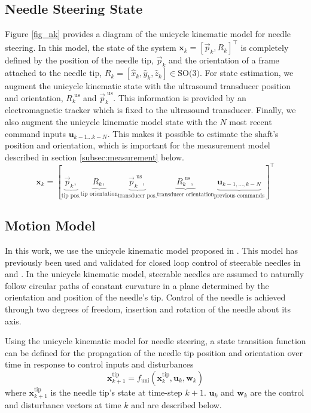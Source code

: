 \documentclass[journal,transmag]{IEEEtran}
\newcommand{\bvar}[2]{\mathbf{#1}_{#2}}
\newcommand{\usorientation}[1][k]{R^{\text{ us}}_{#1}}
\newcommand{\uspos}[1][k]{\vec{p}^{\text{ us}}_{#1}}
\newcommand{\unistate}[2]{\mathbf{#1}^{\text{tip}}_{#2}}
\begin{document}
\subsection{Needle Steering State} \label{subsec:state}
Figure \ref{fig_nk} provides a diagram of the unicycle kinematic model for needle steering.  In this model, the state of the system $\bvar{x}{k} =  \left[\vec{p}_k, R_k\right]^\top$ is completely defined by the position of the needle tip, $\vec{p}_k$ and the orientation of a frame attached to the needle tip, $R_k = \left[\hat{x}_k,\hat{y}_k,\hat{z}_k\right] \in \text{SO(3)}$.  For state estimation, we augment the unicycle kinematic state with the ultrasound transducer position and orientation, $\usorientation$ and $\uspos$.  This information is provided by an electromagnetic tracker which is fixed to the ultrasound transducer.  Finally,  we also augment the unicycle kinematic model state with the $N$ most recent command inputs $\bvar{u}{k-1...k-N}$.  This makes it possible to estimate the shaft's position and orientation, which is important for the measurement model described in section \ref{subsec:measurement} below.
\begin{dmath*}
\bvar{x}{k} =  \left[\underbrace{\vec{p}_k,}_{\text{tip pos.}} \underbrace{R_k,}_{\text{tip orientation}} \underbrace{\uspos,}_{\text{transducer pos.}} \underbrace{\usorientation,}_{\text{transducer orientation}} \underbrace{\bvar{u}{k-1,...,k-N}}_{\text{previous commands}}\right]^\top
\end{dmath*}


\subsection{Motion Model} \label{subsec:unicycle}
In this work, we use the unicycle kinematic model proposed in \cite{Park2005}.  This model has previously been used and validated for closed loop control of steerable needles in \cite{Majewicz2013} and \cite{adebar2014recursive}.  In the unicycle kinematic model, steerable needles are assumed to naturally follow circular paths of constant curvature in a plane determined by the orientation and position of the needle's tip.  Control of the needle is achieved through two degrees of freedom, insertion and rotation of the needle about its axis.

Using the unicycle kinematic model for needle steering, a state transition function can be defined for the propagation of the needle tip position and orientation over time in response to control inputs and disturbances
\begin{equation*}
\unistate{x}{k+1} = f_{\text{uni}}(\unistate{x}{k}, \bvar{u}{k}, \bvar{w}{k})
\end{equation*}  
where $\unistate{x}{k+1}$ is the needle tip's state at time-step $k+1$. $\bvar{u}{k}$ and $\bvar{w}{k}$ are the control and disturbance vectors at time $k$ and are described below.  
\end{document}
